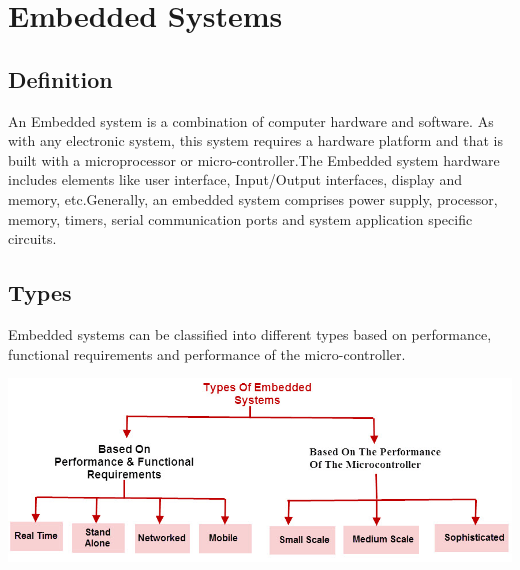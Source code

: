 \section{Embedded Systems}


\subsection{Definition}
An Embedded system is a combination of computer hardware and software. As with any electronic system, this system requires a hardware platform and that is built with a microprocessor or micro-controller.The Embedded system hardware includes elements like user interface, Input/Output interfaces, display and memory, etc.Generally, an embedded system comprises power supply, processor, memory, timers, serial  communication ports and system application specific circuits.


\subsection{Types}
Embedded systems can be classified into different types based on performance, functional requirements and performance of the micro-controller.\\

\centerline{
	\includegraphics[width=1.0\textwidth]{overview/images/types.jpg}
}

